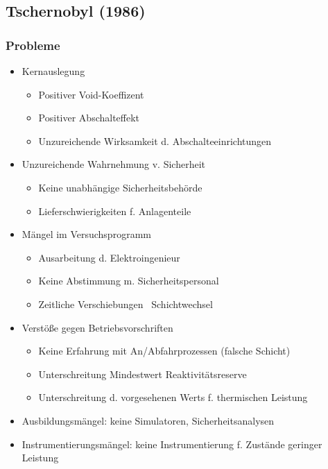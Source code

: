 \documentclass[12pt]{article}
\begin{document}
\subsection{Tschernobyl (1986)}

\subsubsection{Probleme}
\begin{itemize}
	\item Kernauslegung
		\begin{itemize}
			\item Positiver Void-Koeffizent
			\item Positiver Abschalteffekt
			\item Unzureichende Wirksamkeit d. Abschalteeinrichtungen
		\end{itemize}
	\item Unzureichende Wahrnehmung v. Sicherheit
		\begin{itemize}
			\item Keine unabhängige Sicherheitsbehörde
			\item Lieferschwierigkeiten f. Anlagenteile
		\end{itemize}
	\item Mängel im Versuchsprogramm
		\begin{itemize}
			\item Ausarbeitung d. Elektroingenieur
			\item Keine Abstimmung m. Sicherheitspersonal
			\item Zeitliche Verschiebungen \textrightarrow\ Schichtwechsel
		\end{itemize}
	\item Verstöße gegen Betriebsvorschriften
		\begin{itemize}
			\item Keine Erfahrung mit An/Abfahrprozessen (falsche Schicht)
			\item Unterschreitung Mindestwert Reaktivitätsreserve
			\item Unterschreitung d. vorgesehenen Werts f. thermischen Leistung
		\end{itemize}
	\item Ausbildungsmängel: keine Simulatoren, Sicherheitsanalysen
	\item Instrumentierungsmängel: keine Instrumentierung f. Zustände geringer Leistung
\end{itemize}
\end{document}
